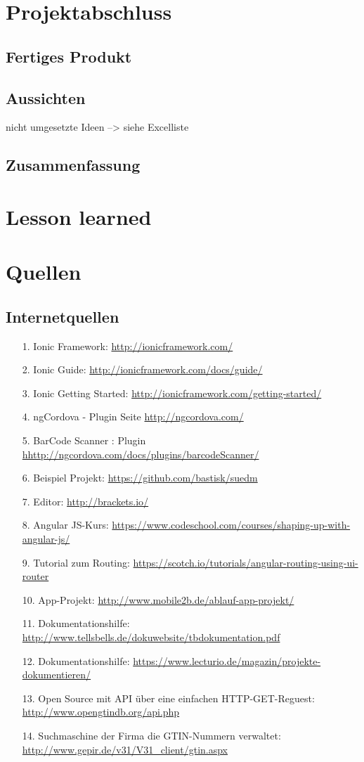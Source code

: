 \documentclass[12pt,a4paper]{article}
\begin{document}
\section{Projektabschluss}
\subsection{Fertiges Produkt}
\subsection{Aussichten}
nicht umgesetzte Ideen --> siehe Excelliste
\newpage
\subsection{Zusammenfassung}
\newpage
\section{Lesson learned}
\newpage
\section*{Quellen}
\subsection*{Internetquellen}
\begin{itemize}
\item[1.]Ionic Framework: \url{http://ionicframework.com/}
\item[2.]Ionic Guide: \url{http://ionicframework.com/docs/guide/}
\item[3.]Ionic Getting Started: \url{http://ionicframework.com/getting-started/}
\item[4.]ngCordova - Plugin Seite \url{http://ngcordova.com/}
\item[5.]BarCode Scanner : Plugin \url{hhttp://ngcordova.com/docs/plugins/barcodeScanner/}
\item[6.]Beispiel Projekt: \url{https://github.com/bastisk/suedm}
\item[7.]Editor: \url{http://brackets.io/}
\item[8.]Angular JS-Kurs: \url{https://www.codeschool.com/courses/shaping-up-with-angular-js/}
\item[9.]Tutorial zum Routing: \url{https://scotch.io/tutorials/angular-routing-using-ui-router}
\item[10.]App-Projekt: \url{http://www.mobile2b.de/ablauf-app-projekt/}
\item[11.] Dokumentationshilfe: \url{http://www.tellsbells.de/dokuwebsite/tbdokumentation.pdf}
\item[12.] Dokumentationshilfe: \url{https://www.lecturio.de/magazin/projekte-dokumentieren/}
\item[13.] Open Source mit API über eine einfachen HTTP-GET-Reguest: \url{http://www.opengtindb.org/api.php}
\item[14.] Suchmaschine der Firma die GTIN-Nummern verwaltet: \url{http://www.gepir.de/v31/V31_client/gtin.aspx}
\end{itemize}
\end{document}
